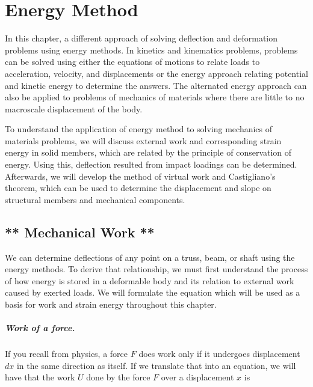 \documentclass[
10pt,
a4paper,
openany,
svgnames,
]{kaobook} %
\begin{document}

\chapter{Energy Method}

In this chapter, a different approach of solving deflection and deformation problems using energy methods. In kinetics and kinematics problems, problems can be solved using either the equations of motions to relate loads to acceleration, velocity, and displacements or the energy approach relating potential and kinetic energy to determine the answers. The alternated energy approach can also be applied to problems of mechanics of materials where there are little to no macroscale displacement of the body.

To understand the application of energy method to solving mechanics of materials problems, we will discuss external work and corresponding strain energy in solid members, which are related by the principle of conservation of energy. Using this, deflection resulted from impact loadings can be determined. Afterwards, we will develop the method of virtual work and Castigliano's theorem, which can be used to determine the displacement and slope on structural members and mechanical components.

\section{** Mechanical Work **}

We can determine deflections of any point on a truss, beam, or shaft using the energy methods. To derive that relationship, we must first understand the process of how energy is stored in a deformable body and its relation to external work caused by exerted loads. We will formulate the equation which will be used as a basis for work and strain energy throughout this chapter.

\paragraph{Work of a force.}

If you recall from physics, a force $F$ does work only if it undergoes displacement $dx$ in the same direction as itself. If we translate that into an equation, we will have that the work $U$ done by the force $F$ over a displacement $x$ is
\end{document}
